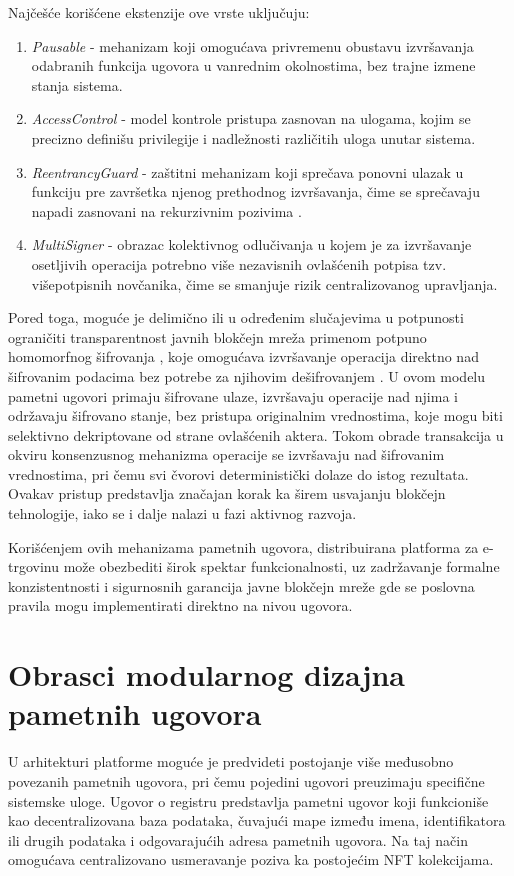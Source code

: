 Najčešće korišćene ekstenzije ove vrste uključuju:
\begin{enumerate}
\item \textit{Pausable} - mehanizam koji omogućava privremenu obustavu izvršavanja odabranih funkcija ugovora u vanrednim okolnostima, bez trajne izmene stanja sistema.
\item \textit{AccessControl} - model kontrole pristupa zasnovan na ulogama, kojim se precizno definišu privilegije i nadležnosti različitih uloga unutar sistema.
\item \textit{ReentrancyGuard} - zaštitni mehanizam koji sprečava ponovni ulazak u funkciju pre završetka njenog prethodnog izvršavanja, čime se sprečavaju napadi zasnovani na rekurzivnim pozivima \cite{samreen2020reentrancy}.
\item \textit{MultiSigner} - obrazac kolektivnog odlučivanja u kojem je za izvršavanje osetljivih operacija potrebno više nezavisnih ovlašćenih potpisa tzv. višepotpisnih novčanika, čime se smanjuje rizik centralizovanog upravljanja.
\end{enumerate}

Pored toga, moguće je delimično ili u određenim slučajevima u potpunosti ograničiti transparentnost javnih blokčejn mreža primenom potpuno homomorfnog šifrovanja , koje omogućava izvršavanje operacija direktno nad šifrovanim podacima bez potrebe za njihovim dešifrovanjem \cite{fhevm}. U ovom modelu pametni ugovori primaju šifrovane ulaze, izvršavaju operacije nad njima i održavaju šifrovano stanje, bez pristupa originalnim vrednostima, koje mogu biti selektivno dekriptovane od strane ovlašćenih aktera. Tokom obrade transakcija u okviru konsenzusnog mehanizma operacije se izvršavaju nad šifrovanim vrednostima, pri čemu svi čvorovi deterministički dolaze do istog rezultata. Ovakav pristup predstavlja značajan korak ka širem usvajanju blokčejn tehnologije, iako se i dalje nalazi u fazi aktivnog razvoja.

Korišćenjem ovih mehanizama pametnih ugovora, distribuirana platforma za e-trgovinu može obezbediti širok spektar funkcionalnosti, uz zadržavanje formalne konzistentnosti i sigurnosnih garancija javne blokčejn mreže gde se poslovna pravila mogu implementirati direktno na nivou ugovora.

\section{Obrasci modularnog dizajna pametnih ugovora}
U arhitekturi platforme moguće je predvideti postojanje više međusobno povezanih pametnih ugovora, pri čemu pojedini ugovori preuzimaju specifične sistemske uloge. Ugovor o registru \cite{xu2018pattern}  predstavlja pametni ugovor koji funkcioniše kao decentralizovana baza podataka, čuvajući mape između imena, identifikatora ili drugih podataka i odgovarajućih adresa pametnih ugovora. Na taj način omogućava centralizovano usmeravanje poziva ka postojećim NFT kolekcijama.

